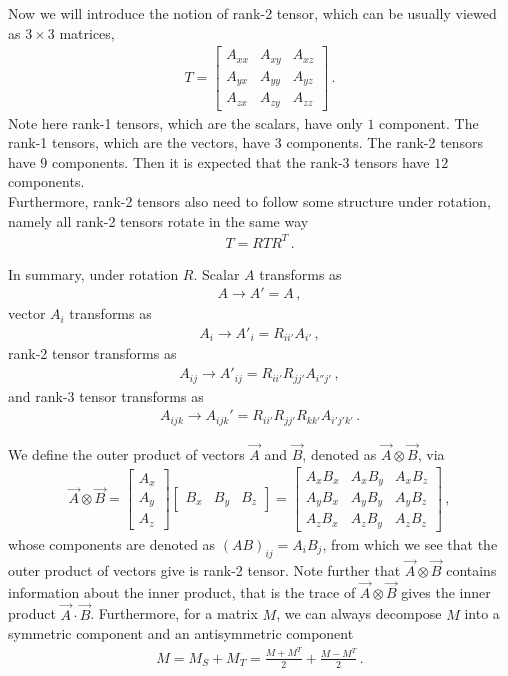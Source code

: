 \documentclass[11pt, onesided]{book}
\theoremstyle{break}
\theoremstyle{break}
\newcommand{\bmat}[1]{\begin{bmatrix} #1 \end{bmatrix}}
\begin{document}
Now we will introduce the notion of rank-2 tensor, which can be usually viewed as $3\times3$ matrices, 
\begin{align*}
T = \bmat{
A_{xx} & A_{xy} & A_{xz}\\
A_{yx} & A_{yy} & A_{yz}\\
A_{zx} & A_{zy} & A_{zz}
}\,.
\end{align*}
Note here rank-1 tensors, which are the scalars, have only $1$ component. The rank-1 tensors, which are the vectors, have $3$ components. The rank-2 tensors have $9$ components. Then it is expected that the rank-3 tensors have $12$ components. 
\\

Furthermore, rank-2 tensors also need to follow some structure under rotation, namely all rank-2 tensors rotate in the same way
\begin{align*}
T = RTR^{T}\,.
\end{align*}

In summary, under rotation $R$. Scalar $A$ transforms as
\begin{align*}
A \to A' = A\,,
\end{align*}
vector $A_i$ transforms as
\begin{align*}
A_i \to A'_i = R_{ii'}A_{i'}\,,
\end{align*}
rank-2 tensor transforms as
\begin{align*}
A_{ij} \to A'_{ij} = R_{ii'} R_{jj'} A_{i''j'}\,,
\end{align*}
and rank-3 tensor transforms as
\begin{align*}
A_{ijk} \to A_{ijk}'= R_{ii'}R_{jj'}R_{kk'}A_{i'j'k'}\,.
\end{align*}

We define the outer product of vectors $\vec{A}$ and $\vec{B}$, denoted as $\vec{A}\otimes \vec{B}$, via
\begin{align*}
\vec{A}\otimes \vec{B} = \bmat{A_x \\ A_y \\ A_z} \bmat{B_x&B_y &B_z} = 
\bmat{
A_xB_x & A_xB_y & A_xB_z\\
A_yB_x & A_yB_y & A_yB_z\\
A_zB_x & A_zB_y & A_zB_z
}\,,
\end{align*}
whose components are denoted as $(AB)_{ij} = A_iB_j$, from which we see that the outer product of vectors give is rank-2 tensor. Note further that $\vec{A}\otimes \vec{B}$ contains information about the inner product, that is the trace of $\vec{A}\otimes \vec{B}$ gives the inner product $\vec{A}\cdot \vec{B}$. Furthermore, for a matrix $M$, we can always decompose $M$ into a symmetric component and an antisymmetric component
\begin{align*}
M = M_S + M_T = \frac{M+M^T}{2} + \frac{M-M^T}{2}\,.
\end{align*}
\end{document}
